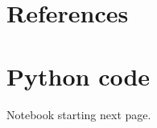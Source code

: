 \documentclass{article}
\begin{document}
\section{References}



\section{Python code}
Notebook starting next page.

%
\end{document}
